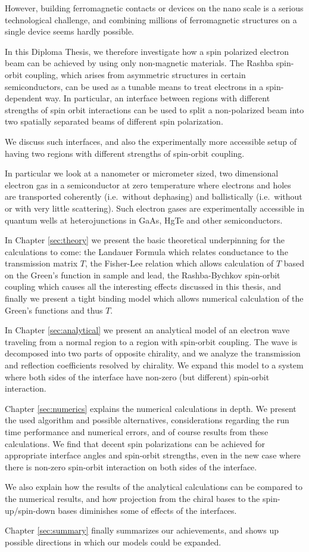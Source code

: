 However, building ferromagnetic contacts or devices on
the nano scale is a serious technological challenge, and combining millions of
ferromagnetic structures on a single device seems hardly possible.

In this Diploma Thesis, we therefore investigate how a spin polarized electron
beam can be achieved by using only non-magnetic materials. The Rashba 
spin-orbit coupling, which arises from
asymmetric structures in certain semiconductors, can be used as a tunable
means to treat
electrons in a spin-dependent way. In particular, an interface
between regions with different strengths of spin orbit interactions can be
used to split a non-polarized beam into two spatially separated beams of
different spin polarization.

We discuss such interfaces, and also the experimentally more accessible setup
of having two regions with different strengths of spin-orbit coupling.

In particular we look at a nanometer or micrometer sized, two dimensional
electron gas in a semiconductor at zero temperature where electrons and holes
are transported coherently (i.e.~without dephasing) and ballistically
(i.e.~without or with very little scattering). Such electron gases are
experimentally accessible in quantum wells at heterojunctions in GaAs,
HgTe and other semiconductors.

In Chapter \ref{sec:theory} we present the basic theoretical underpinning for
the calculations to come: the Landauer Formula which relates conductance to
the transmission matrix $T$, the Fisher-Lee relation which allows calculation
of $T$ based on the Green's function in sample and lead, the Rashba-Bychkov
spin-orbit coupling which causes all the interesting effects discussed in this
thesis, and finally we present a tight binding model which allows numerical
calculation of the Green's functions and thus $T$.

In Chapter \ref{sec:analytical} we present an analytical model of an electron
wave traveling from a normal region to a region with spin-orbit coupling. The
wave is decomposed into two parts of opposite chirality, and we 
analyze the transmission and reflection coefficients resolved by chirality.
We expand this model to a system where both sides of the interface have
non-zero (but different) spin-orbit interaction.

Chapter \ref{sec:numerics} explains the numerical calculations in depth. We
present the used algorithm and possible alternatives, considerations regarding
the run time performance and numerical errors, and of course results from
these calculations. We find that decent spin polarizations can be achieved
for appropriate interface angles and spin-orbit strengths, even in the new
case where there is non-zero spin-orbit interaction on both sides of
the interface.

We also explain how the results of the analytical calculations can be compared
to the numerical results, and how projection from the chiral bases to the
spin-up/spin-down bases diminishes some of effects of the interfaces.

Chapter \ref{sec:summary} finally summarizes our achievements, and shows up
possible directions in which our models could be expanded.

